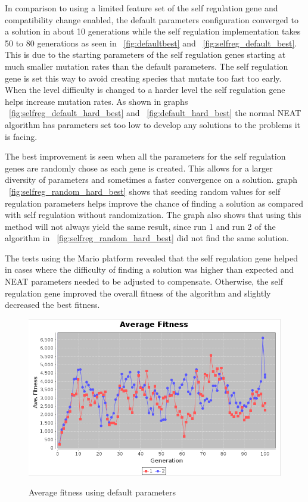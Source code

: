 \documentclass[12pt]{ucthesis} \newif\ifpdf \ifx\pdfoutput\undefined
\begin{document}
In comparison to using a limited feature set of the self regulation gene and
compatibility change enabled, the default parameters configuration converged to
a solution in about 10 generations while the self regulation implementation takes 50 to 80
generations as seen in ~\ref{fig:defaultbest} and 
~\ref{fig:selfreg_default_best}. This is due to the starting parameters of the
self regulation genes starting at much smaller mutation rates than the default
parameters. The self regulation gene is set this way to avoid creating species
that mutate too fast too early.
When the level difficulty is changed to a harder level the self regulation gene
helps increase mutation rates. As shown in graphs
~\ref{fig:selfreg_default_hard_best} and ~\ref{fig:default_hard_best} the normal
NEAT algorithm has parameters set too low to develop any solutions to the
problems it is facing.

The best improvement is seen when all the parameters for the self regulation
genes are randomly chose as each gene is created. This allows for a larger
diversity of parameters and sometimes a faster convergence on a solution. graph
~\ref{fig:selfreg_random_hard_best} shows that seeding random values for self
regulation parameters helps improve the chance of finding a solution as compared
with self regulation without randomization. The graph also shows that using this
method will not always yield the same result, since run 1 and run 2 of the
algorithm in ~\ref{fig:selfreg_random_hard_best} did not find the same solution.

The tests using the Mario platform revealed that the self regulation gene helped
in cases where the difficulty of finding a solution was higher than expected and
NEAT parameters needed to be adjusted to compensate. Otherwise, the self
regulation gene improved the overall fitness of the algorithm and slightly
decreased the best fitness.

\begin{figure}[h!]
  \caption{Average fitness using default parameters}
  \centering
    \includegraphics[width=1\textwidth]{graphsone/defaultave.png}
   \label{fig:defaultave} 
\end{figure}
\end{document}
